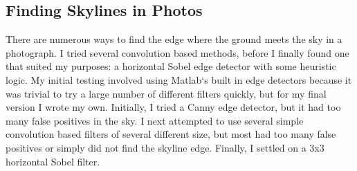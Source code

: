 \documentclass{acm_proc_article-sp}
\begin{document}
\subsection{Finding Skylines in Photos}
    There are numerous ways to find the edge where the ground meets the sky in a photograph.  I tried several convolution based methods, before I finally found one that suited my purposes:  a horizontal Sobel edge detector with some heuristic logic.  My initial testing involved using Matlab`s built in edge detectors \cite{mcandrew2004introduction} because it was trivial to try a large number of different filters quickly, but for my final version I wrote my own.  Initially, I tried a Canny edge detector, but it had too many false positives in the sky.  I next attempted to use several simple convolution \cite{Schafer:DSP} based filters of several different size, but most had too many false positives or simply did not find the skyline edge.  Finally, I settled on a 3x3 horizontal Sobel filter. \cite{behringer2002registration}  
\end{document}

